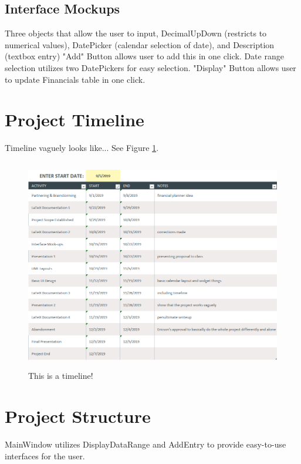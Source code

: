 \documentclass[10pt,conference,onecolumn,compsoc]{IEEEtran}
\begin{document}

\subsection{Interface Mockups}
Three objects that allow the user to input, DecimalUpDown (restricts to numerical values), DatePicker (calendar selection of date), and Description (textbox entry)
 "Add" Button allows user to add this in one click.
Date range selection utilizes two DatePickers for easy selection.
"Display" Button allows user to update Financials table in one click.

\section{Project Timeline}
Timeline vaguely looks like... See Figure \ref{Timeline}.

\begin{figure}[ht!]
\includegraphics[height=350px, width=500px]{Timeline.png}
\caption{This is a timeline!}
\label{Timeline}
\end{figure}

\section{Project Structure}
MainWindow utilizes DisplayDataRange and AddEntry to provide easy-to-use interfaces for the user.
\end{document}
